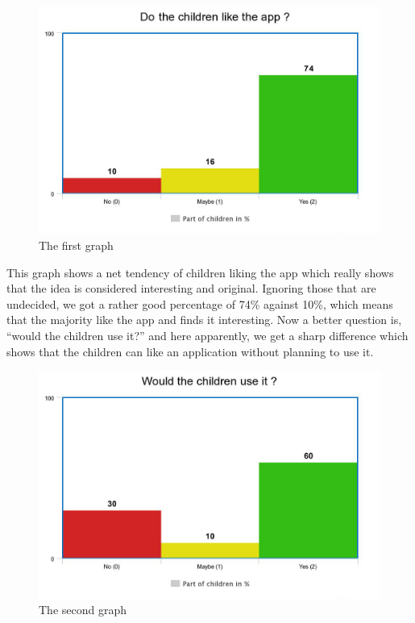 \documentclass[12pt]{scrartcl}
\begin{document}
			\begin{figure}[H]
                        		\centering
               			\includegraphics[width=\textwidth]{../images/image_2_data_analysis.jpeg}
               			\caption{The first graph}
                        		\label{analysis2}
      			\end{figure}

			This graph shows a net tendency of children liking the app which really shows that the idea is considered interesting and original. Ignoring those that are undecided, we got a rather good percentage of 74\% against 10\%, which means that the majority like the app and finds it interesting. Now a better question is, “would the children use it?” and here apparently, we get a sharp difference which shows that the children can like an application without planning to use it.\\

			\begin{figure}[H]
                        		\centering
               			\includegraphics[width=\textwidth]{../images/image_3_data_analysis.jpeg}
               			\caption{The second graph}
                        		\label{analysis3}
      			\end{figure}
\end{document}
